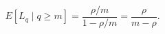 \begin{equation}
    E\left[L_q \mid q \geq m\right]=\frac{\rho / m}{1-\rho / m}=\frac{\rho}{m-\rho} .
\end{equation}